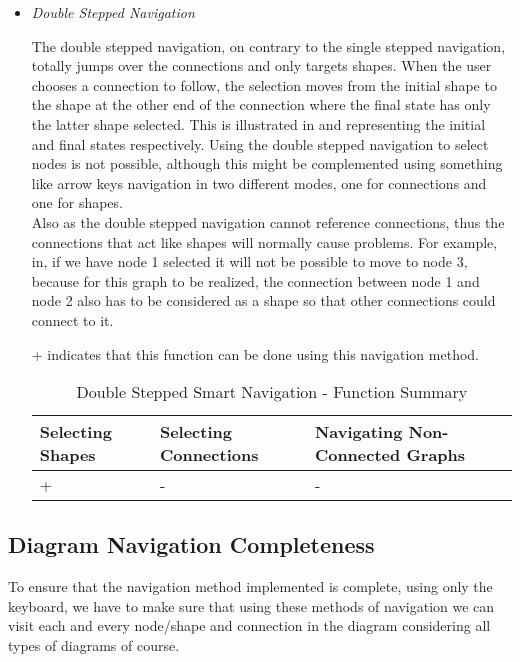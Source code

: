 \begin{itemize}
\item {\it Double Stepped Navigation}
\par \noindent
The double stepped navigation, on contrary to the single stepped navigation, totally jumps over the connections and only targets shapes. When the user chooses a connection to follow, the selection moves from the initial shape to the shape at the other end of the connection where the final state has only the latter shape selected. This is illustrated in and representing the initial and final states respectively. Using the double stepped navigation to select nodes is not possible, although this might be complemented using something like arrow keys navigation in two different modes, one for connections and one for shapes.\\
Also as the double stepped navigation cannot reference connections, thus the connections that act like shapes will normally cause problems. For example, in, if we have node 1 selected it will not be possible to move to node 3, because for this graph to be realized, the connection between node 1 and node 2 also has to be considered as a shape so that other connections could connect to it.

\begin{table}[H]
\begin{center}
\begin{flushleft}
\footnotesize
{+ indicates that this function can be done using this navigation method.}\\
\end{flushleft}
	\begin{tabular}{| l | l | l |}
	\hline
	Selecting Shapes & Selecting Connections & Navigating Non-Connected Graphs \\ \hline
	+ & - & - \\ \hline
	\end{tabular}
\caption{Double Stepped Smart Navigation - Function Summary}
\end{center}
\end{table}


\end{itemize}

\subsection{Diagram Navigation Completeness}
To ensure that the navigation method implemented is complete, using only the keyboard, we have to make sure that using these methods of navigation we can visit each and every node/shape and connection in the diagram considering all types of diagrams of course.

